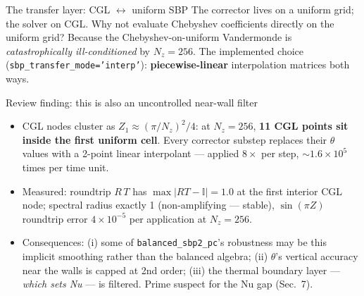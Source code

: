 \documentclass[aspectratio=169,10pt]{beamer}
\begin{document}
\begin{frame}{The transfer layer: CGL $\leftrightarrow$ uniform SBP}
  The corrector lives on a uniform grid; the solver on CGL. Why not evaluate
  Chebyshev coefficients directly on the uniform grid? Because the
  Chebyshev-on-uniform Vandermonde is \emph{catastrophically ill-conditioned} by
  $N_z=256$. The implemented choice (\texttt{sbp\_transfer\_mode='interp'}):
  \textbf{piecewise-linear} interpolation matrices both ways.
  \begin{alertblock}{Review finding: this is also an uncontrolled near-wall filter}
    \begin{itemize}\small
      \item CGL nodes cluster as $Z_1 \approx (\pi/N_z)^2/4$: at $N_z{=}256$,
        \textbf{11 CGL points sit inside the first uniform cell}. Every corrector
        substep replaces their $\theta$ values with a 2-point linear interpolant ---
        applied $8\times$ per step, $\sim1.6\times10^5$ times per time unit.
      \item Measured: roundtrip $R\,T$ has $\max|RT-\mathbb{I}| = 1.0$ at the first
        interior CGL node; spectral radius exactly 1 (non-amplifying --- stable),
        $\sin(\pi Z)$ roundtrip error $4\times10^{-5}$ per application at $N_z{=}256$.
      \item Consequences: (i) some of \texttt{balanced\_sbp2\_pc}'s robustness may be
        this implicit smoothing rather than the balanced algebra;
        (ii) $\theta$'s vertical accuracy near the walls is capped at 2nd order;
        (iii) the thermal boundary layer --- \emph{which sets Nu} --- is filtered.
        Prime suspect for the Nu gap (Sec.~7).
    \end{itemize}
  \end{alertblock}
\end{frame}
\end{document}
